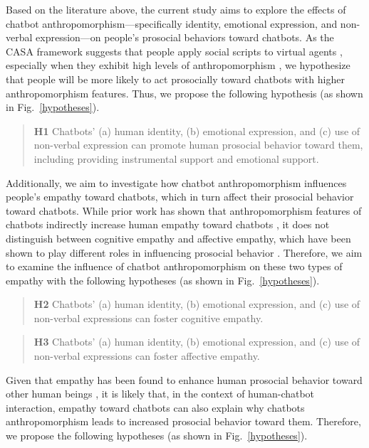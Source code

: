 Based on the literature above, the current study aims to explore the effects of chatbot anthropomorphism—specifically identity, emotional expression, and non-verbal expression—on people’s prosocial behaviors toward chatbots. As the CASA framework suggests that people apply social scripts to virtual agents \cite{nass_CASA,nass_mindlessness}, especially when they exhibit high levels of anthropomorphism \cite{gambino2020building}, we hypothesize that people will be more likely to act prosocially toward chatbots with higher anthropomorphism features. Thus, we propose the following hypothesis (as shown in Fig.~\ref{hypotheses}).



\begin{quote}
\textbf{H1} Chatbots' (a) human identity, (b) emotional expression, and (c) use of non-verbal expression can promote human prosocial behavior toward them, including providing instrumental support and emotional support.
\end{quote}

Additionally, we aim to investigate how chatbot anthropomorphism influences people’s empathy toward chatbots, which in turn affect their prosocial behavior toward chatbots. While prior work has shown that anthropomorphism features of chatbots indirectly increase human empathy toward chatbots \cite{janson2023leverage}, it does not distinguish between cognitive empathy and affective empathy, which have been shown to play different roles in influencing prosocial behavior \cite{barlinska2018cyberbullying, edele2013explaining, brazil2023empathy}.
Therefore, we aim to examine the influence of chatbot anthropomorphism on these two types of empathy with the following hypotheses (as shown in Fig.~\ref{hypotheses}).


\begin{quote}
\textbf{H2} Chatbots' (a) human identity, (b) emotional expression, and (c) use of non-verbal expressions can foster cognitive empathy.
\end{quote}
\begin{quote}
\textbf{H3} Chatbots' (a) human identity, (b) emotional expression, and (c) use of non-verbal expressions can foster affective empathy.
\end{quote}

Given that empathy has been found to enhance human prosocial behavior toward other human beings \cite{hoffman2008empathy,Eisenberg1987,roberts1996empathy}, it is likely that, in the context of human-chatbot interaction, empathy toward chatbots can also explain why chatbots anthropomorphism leads to increased prosocial behavior toward them. Therefore, we propose the following hypotheses (as shown in Fig.~\ref{hypotheses}).

